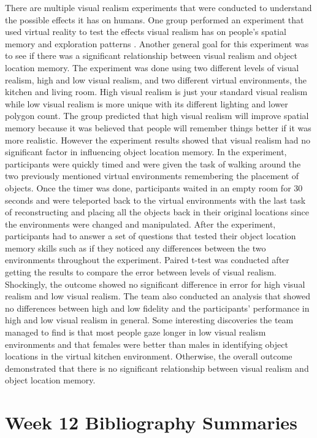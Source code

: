 \documentclass{article}
\begin{document}
There are multiple visual realism experiments that were conducted to understand the possible effects it has on humans. One group performed an experiment that used virtual reality to test the effects visual realism has on people’s spatial memory and exploration patterns \cite{10.1145/3385956.3418945}. Another general goal for this experiment was to see if there was a significant relationship between visual realism and object location memory. The experiment was done using two different levels of visual realism, high and low visual realism, and two different virtual environments, the kitchen and living room. High visual realism is just your standard visual realism while low visual realism is more unique with its different lighting and lower polygon count. The group predicted that high visual realism will improve spatial memory because it was believed that people will remember things better if it was more realistic. However the experiment results showed that visual realism had no significant factor in influencing object location memory. In the experiment, participants were quickly timed and were given the task of walking around the two previously mentioned virtual environments remembering the placement of objects. Once the timer was done, participants waited in an empty room for 30 seconds and were teleported back to the virtual environments with the last task of reconstructing and placing all the objects back in their original locations since the environments were changed and manipulated. After the experiment, participants had to answer a set of questions that tested their object location memory skills such as if they noticed any differences between the two environments throughout the experiment. Paired t-test was conducted after getting the results to compare the error between levels of visual realism. Shockingly, the outcome showed no significant difference in error for high visual realism and low visual realism. The team also conducted an analysis that showed no differences between high and low fidelity and the participants' performance in high and low visual realism in general. Some interesting discoveries the team managed to find is that most people gaze longer in low visual realism environments and that females were better than males in identifying object locations in the virtual kitchen environment. Otherwise, the overall outcome demonstrated that there is no significant relationship between visual realism and object location memory. 

\section{Week 12 Bibliography Summaries}
\end{document}
